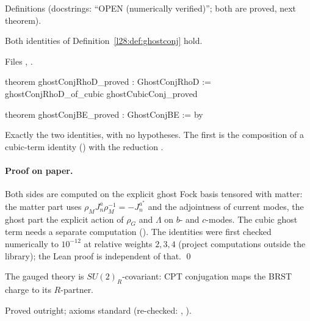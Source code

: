 \begin{status}
Definitions (docstrings: ``OPEN (numerically verified)''; both are proved, next theorem).
\end{status}

\begin{theorem}\label{l28:thm:ghostconj}
Both identities of Definition~\ref{l28:def:ghostconj} hold.
\end{theorem}

\noindent Files , .
\begin{leancode}
theorem ghostConjRhoD_proved : GhostConjRhoD := ghostConjRhoD_of_cubic ghostCubicConj_proved

theorem ghostConjBE_proved : GhostConjBE := by
\end{leancode}

\begin{dictionary}
Exactly the two identities, with no hypotheses. The first is the composition of a cubic-term identity () with the
reduction .
\end{dictionary}

\paragraph{Proof on paper.} Both sides are computed on the explicit ghost Fock basis tensored with matter: the matter part uses
$\rho_M J^a_n\rho_M^{-1}=-J^{a^*}_n$ and the adjointness of current modes, the ghost part the explicit action of $\rho_G$ and $\Lambda$ on
$b$- and $c$-modes. The cubic ghost term needs a separate computation (). The identities were first
checked numerically to $10^{-12}$ at relative weights $2,3,4$ (project computations outside the library); the Lean proof is independent of that. \qed

\begin{physics}
The gauged theory is $SU(2)_R$-covariant: CPT conjugation maps the BRST charge to its $R$-partner.
\end{physics}

\begin{status}
Proved outright; axioms standard (re-checked: , ).
\end{status}


